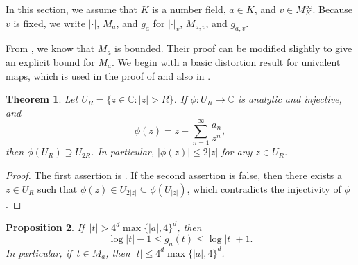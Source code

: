 \documentclass[11pt]{amsart}
\numberwithin{equation}{section}
\theoremstyle{plain}
\newtheorem{thm}{Theorem}[section]
\newtheorem{prop}[thm]{Proposition}
\theoremstyle{definition}
\theoremstyle{remark}
\newcommand{\C}{\mathbb C}
\begin{document}
In this section, we assume that $K$ is a number field, $a\in K$,
and $v\in M_{K}^{\infty}$. Because $v$ is fixed, we write $|\cdot|$,
$M_{a}$, and $g_{a}$ for $|\cdot|_{v}$, $M_{a,v}$, and $g_{a,v}$.

From \cite[Lemma 3.2]{BD1}, we know that $M_{a}$ is bounded. Their
proof can be modified slightly to give an explicit bound for $M_{a}$.
We begin with a basic distortion result for univalent maps, which
is used in the proof of \cite[Lemma 3.2]{BD1} and also in \cite[Section 3.1]{DKY2}.

\begin{thm}\label{thm3.1}
Let $U_{R}=\{z\in\C:|z|>R\}$. If $\phi\colon U_{R}\to\C$
is analytic and injective, and
\[
\phi(z)=z+\sum_{n=1}^{\infty}\frac{a_{n}}{z^{n}},
\]
then $\phi(U_{R})\supseteq U_{2R}$. In particular, $|\phi(z)|\leq2|z|$
for any $z\in U_{R}$.
\end{thm}

\begin{proof}
The first assertion is \cite[Corollary 3.3]{BH}. If the second assertion
is false, then there exists a $z\in U_{R}$ such that $\phi(z)\in U_{2|z|}\subseteq\phi(U_{|z|})$,
which contradicts the injectivity of $\phi$.
\end{proof}

\begin{prop}\label{prop3.2}
If\,  $|t|>4^{d}\max\{|a|,4\}^{d}$, then
\[
\log|t|-1\leq g_{a}(t)\leq\log|t|+1.
\]
In particular, if\, $t\in M_{a}$, then $|t|\leq4^{d}\max\{|a|,4\}^{d}$.
\end{prop}
\end{document}
